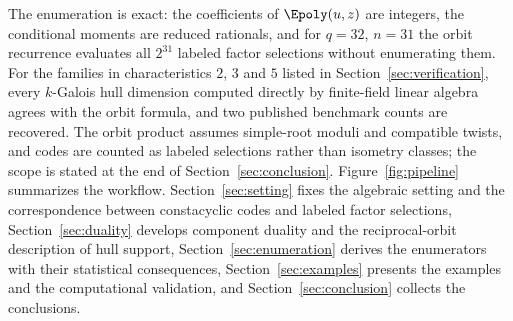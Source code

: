 The enumeration is exact: the coefficients of $\Epoly(u,z)$ are integers, the
conditional moments are reduced rationals, and for $q=32$, $n=31$ the orbit
recurrence evaluates all $2^{31}$ labeled factor selections without enumerating
them. For the families in characteristics $2$, $3$ and $5$ listed in
Section~\ref{sec:verification}, every $k$-Galois hull dimension computed
directly by finite-field linear algebra agrees with the orbit formula, and two
published benchmark counts \cite{sangwisut2015} are recovered. The orbit product
assumes simple-root moduli and compatible twists, and codes are counted as
labeled selections rather than isometry classes; the scope is stated at the end
of Section~\ref{sec:conclusion}. Figure~\ref{fig:pipeline} summarizes the
workflow. Section~\ref{sec:setting} fixes the algebraic setting and the
correspondence between constacyclic codes and labeled factor selections,
Section~\ref{sec:duality} develops component duality and the reciprocal-orbit
description of hull support, Section~\ref{sec:enumeration} derives the
enumerators with their statistical consequences, Section~\ref{sec:examples}
presents the examples and the computational validation, and
Section~\ref{sec:conclusion} collects the conclusions.
